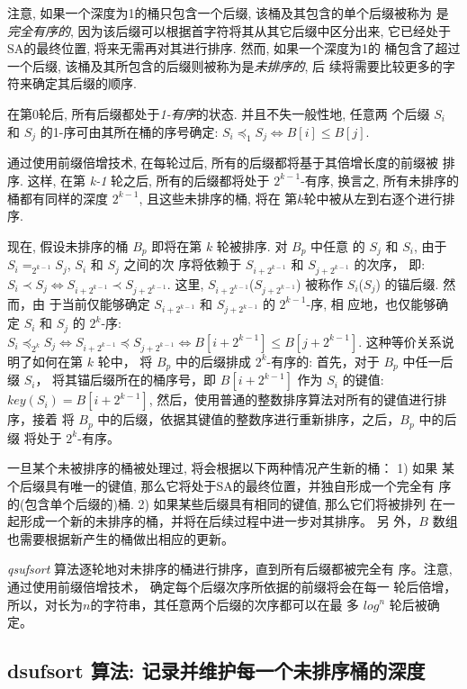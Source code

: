 \documentclass{ws-ijprai}
\begin{document}
注意, 如果一个深度为1的桶只包含一个后缀, 该桶及其包含的单个后缀被称为
是\emph{完全有序的}, 因为该后缀可以根据首字符将其从其它后缀中区分出来,
它已经处于SA的最终位置, 将来无需再对其进行排序. 然而, 如果一个深度为1的
桶包含了超过一个后缀, 该桶及其所包含的后缀则被称为是\emph{未排序的}, 后
续将需要比较更多的字符来确定其后缀的顺序.

在第0轮后, 所有后缀都处于\emph{1-有序}的状态. 并且不失一般性地, 任意两
个后缀 $S_i$ 和 $S_j$ 的1-序可由其所在桶的序号确定:
$S_i \preceq_1 S_j \iff B[i] \leq B[j]$.

通过使用前缀倍增技术, 在每轮过后, 所有的后缀都将基于其倍增长度的前缀被
排序. 这样, 在第 \emph{k-1} 轮之后, 所有的后缀都将处于 $2^{k-1}$-有序,
换言之, 所有未排序的桶都有同样的深度 $2^{k-1}$, 且这些未排序的桶, 将在
第$k$轮中被从左到右逐个进行排序.

现在, 假设未排序的桶 $B_p$ 即将在第 $k$ 轮被排序. 对 $B_p$ 中任意
的 $S_j$ 和 $S_i$, 由于 $S_i =_{2^{k-1}} S_j$, $S_i$ 和 $S_j$ 之间的次
序将依赖于 $S_{i+2^{k-1}}$ 和 $S_{j+2^{k-1}}$ 的次序， 即:
$S_i \prec S_j \iff S_{i+2^{k-1}} \prec S_{j+2^{k-1}}$. 这里,
$S_{i+2^{k-1}}$($S_{j+2^{k-1}}$) 被称作 $S_i$($S_j$) 的锚后缀. 然而，由
于当前仅能够确定 $S_{i+2^{k-1}}$ 和 $S_{j+2^{k-1}}$ 的 $2^{k-1}$-序, 相
应地，也仅能够确定 $S_i$ 和 $S_j$ 的 $2^k$-序:
$S_i \preceq_{2^k} S_j \iff S_{i+2^{k-1}} \preceq S_{j+2^{k-1}} \iff
B[i+2^{k-1}] \leq B[j+2^{k-1}]$.  这种等价关系说明了如何在第 $k$ 轮中，
将 $B_p$ 中的后缀排成 $2^k$-有序的: 首先，对于 $B_p$ 中任一后缀 $S_i$，
将其锚后缀所在的桶序号，即 $B[i+2^{k-1}]$ 作为 $S_i$ 的键值: $key(S_i)
= B[i+2^{k-1}]$, 然后，使用普通的整数排序算法对所有的键值进行排序，接着
将 $B_p$ 中的后缀，依据其键值的整数序进行重新排序，之后，$B_p$ 中的后缀
将处于 $2^k$-有序。

一旦某个未被排序的桶被处理过, 将会根据以下两种情况产生新的桶： 1) 如果
某个后缀具有唯一的键值, 那么它将处于SA的最终位置，并独自形成一个完全有
序的(包含单个后缀的)桶. 2) 如果某些后缀具有相同的键值, 那么它们将被排列
在一起形成一个新的未排序的桶，并将在后续过程中进一步对其排序。 另
外，$B$ 数组也需要根据新产生的桶做出相应的更新。

\emph{qsufsort} 算法逐轮地对未排序的桶进行排序，直到所有后缀都被完全有
序。注意, 通过使用前缀倍增技术， 确定每个后缀次序所依据的前缀将会在每一
轮后倍增，所以，对长为$n$的字符串，其任意两个后缀的次序都可以在最
多 $log^n$ 轮后被确定。

\subsection{dsufsort 算法: 记录并维护每一个未排序桶的深度}
\label{sec:dsufsort}
\end{document}
